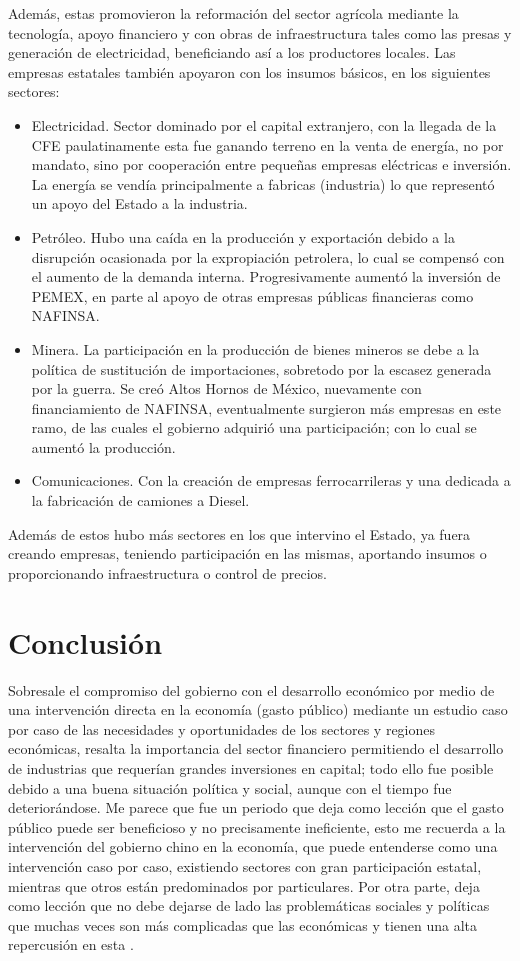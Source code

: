 Además, estas promovieron la reformación del sector agrícola mediante la tecnología, apoyo financiero y con obras de infraestructura tales como las presas y generación de electricidad, beneficiando así a los productores locales.
Las empresas estatales también apoyaron con los insumos básicos, en los siguientes sectores:
\begin{itemize}
    \item Electricidad. Sector dominado por el capital extranjero, con la llegada de la CFE paulatinamente esta fue ganando terreno en la venta de energía, no por mandato, sino por cooperación entre pequeñas empresas eléctricas e inversión. La energía se vendía principalmente a fabricas (industria) lo que representó un apoyo del Estado a la industria.
    \item Petróleo. Hubo una caída en la producción y exportación debido a la disrupción ocasionada por la expropiación petrolera, lo cual se compensó con el aumento de la demanda interna. Progresivamente aumentó la inversión de PEMEX, en parte al apoyo de otras empresas públicas financieras como NAFINSA.
    \item Minera. La participación en la producción de bienes mineros se debe a la política de sustitución de importaciones, sobretodo por la escasez generada por la guerra. Se creó Altos Hornos de México, nuevamente con financiamiento de NAFINSA, eventualmente surgieron más empresas en este ramo, de las cuales el gobierno adquirió una participación; con lo cual se aumentó la producción.
    \item Comunicaciones. Con la creación de empresas ferrocarrileras y una dedicada a la fabricación de camiones a Diesel.
\end{itemize}
Además de estos hubo más sectores en los que intervino el Estado, ya fuera creando empresas, teniendo participación en las mismas, aportando insumos o proporcionando infraestructura o control de precios.

\section{Conclusión}
Sobresale el compromiso del gobierno con el desarrollo económico por medio de una intervención directa en la economía (gasto público) mediante un estudio caso por caso de las necesidades y oportunidades de los sectores y regiones económicas, resalta la importancia del sector financiero permitiendo el desarrollo de industrias que requerían grandes inversiones en capital; todo ello fue posible debido a una buena situación política y social, aunque con el tiempo fue deteriorándose. Me parece que fue un periodo que deja como lección que el gasto público puede ser beneficioso y no precisamente ineficiente, esto me recuerda a la intervención del gobierno chino en la economía, que puede entenderse como una intervención caso por caso, existiendo sectores con gran participación estatal, mientras que otros están predominados por particulares. Por otra parte, deja como lección que no debe dejarse de lado las problemáticas sociales y políticas que muchas veces son más complicadas que las económicas y tienen una alta repercusión en esta \cite{EstadoyDesarrolloUNAM}.